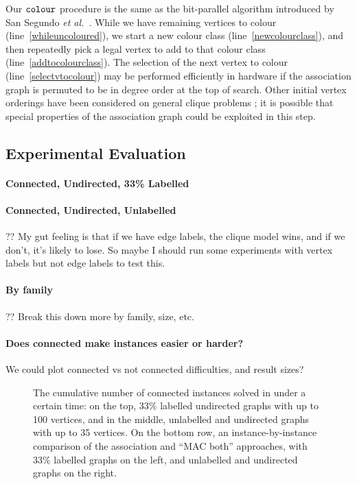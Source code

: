 \documentclass{llncs}
\newcommand{\lineref}[1]{line~\ref{#1}}
\begin{document}
Our $\FuncSty{colour}$ procedure is the same as the bit-parallel algorithm introduced by San Segundo
\textit{et al.}\ \cite{DBLP:journals/cor/SegundoRJ11}. While we have remaining vertices to colour
(\lineref{whileuncoloured}), we start a new colour class (\lineref{newcolourclass}), and then
repeatedly pick a legal vertex to add to that colour class (\lineref{addtocolourclass}).  The
selection of the next vertex to colour (\lineref{selectvtocolour}) may be performed efficiently in
hardware if the association graph is permuted to be in degree order at the top of search. Other
initial vertex orderings have been considered on general clique problems
\cite{DBLP:journals/algorithms/Prosser12,DBLP:conf/lion/SegundoLB14}; it is possible that special
properties of the association graph could be exploited in this step.

\subsection{Experimental Evaluation}

\paragraph{Connected, Undirected, 33\% Labelled}

\paragraph{Connected, Undirected, Unlabelled}

?? My gut feeling is that if we have edge labels, the clique model wins, and if we don't, it's
likely to lose. So maybe I should run some experiments with vertex labels but not edge labels to
test this.

\paragraph{By family} ?? Break this down more by family, size, etc.

\paragraph{Does connected make instances easier or harder?} We could plot connected vs not connected
difficulties, and result sizes?

\begin{figure}[p]
    \centering
    
    \vspace*{1em}

    \centering
    
    \caption{The cumulative number of connected instances solved in under a certain time: on the
        top, 33\% labelled undirected graphs with up to 100 vertices, and in the middle, unlabelled
        and undirected graphs with up to 35 vertices. On the bottom row, an instance-by-instance
        comparison of the association and ``MAC both'' approaches, with 33\% labelled graphs on the
        left, and unlabelled and undirected graphs on the right.} \label{figure:connected-cumulative}
\end{figure}
\end{document}
